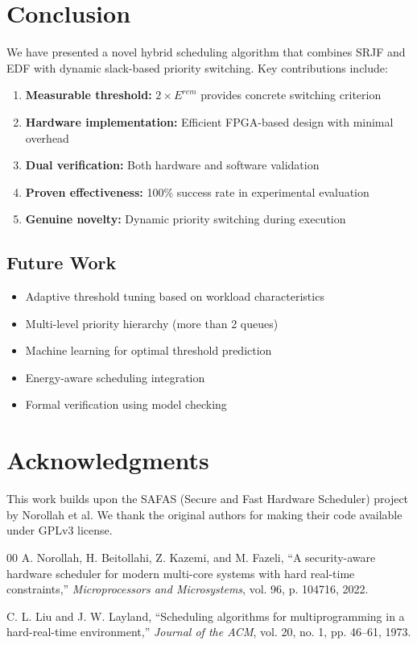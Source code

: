 \documentclass[conference]{IEEEtran}
\begin{document}
\section{Conclusion}

We have presented a novel hybrid scheduling algorithm that combines SRJF and EDF with dynamic slack-based priority switching. Key contributions include:

\begin{enumerate}
    \item \textbf{Measurable threshold:} $2 \times E^{rem}$ provides concrete switching criterion
    \item \textbf{Hardware implementation:} Efficient FPGA-based design with minimal overhead
    \item \textbf{Dual verification:} Both hardware and software validation
    \item \textbf{Proven effectiveness:} 100\% success rate in experimental evaluation
    \item \textbf{Genuine novelty:} Dynamic priority switching during execution
\end{enumerate}

\subsection{Future Work}

\begin{itemize}
    \item Adaptive threshold tuning based on workload characteristics
    \item Multi-level priority hierarchy (more than 2 queues)
    \item Machine learning for optimal threshold prediction
    \item Energy-aware scheduling integration
    \item Formal verification using model checking
\end{itemize}

\section{Acknowledgments}

This work builds upon the SAFAS (Secure and Fast Hardware Scheduler) project by Norollah et al. We thank the original authors for making their code available under GPLv3 license.

\begin{thebibliography}{00}
 A. Norollah, H. Beitollahi, Z. Kazemi, and M. Fazeli, ``A security-aware hardware scheduler for modern multi-core systems with hard real-time constraints,'' \textit{Microprocessors and Microsystems}, vol. 96, p. 104716, 2022.

 C. L. Liu and J. W. Layland, ``Scheduling algorithms for multiprogramming in a hard-real-time environment,'' \textit{Journal of the ACM}, vol. 20, no. 1, pp. 46--61, 1973.
\end{thebibliography}
\end{document}
